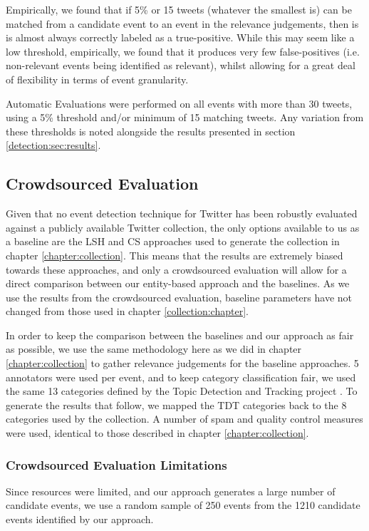 Empirically, we found that if 5\% or 15 tweets (whatever the smallest is) can be matched from a candidate event to an event in the relevance judgements, then is is almost always correctly labeled as a true-positive.
While this may seem like a low threshold, empirically, we found that it produces very few false-positives (i.e. non-relevant events being identified as relevant), whilst allowing for a great deal of flexibility in terms of event granularity.

Automatic Evaluations were performed on all events with more than 30 tweets, using a 5\% threshold and/or minimum of 15 matching tweets.
Any variation from these thresholds is noted alongside the results presented in section \ref{detection:sec:results}.

\subsection{Crowdsourced Evaluation}
\label{sec:baseline}
Given that no event detection technique for Twitter has been robustly evaluated against a publicly available Twitter collection, the only options available to us as a baseline are the LSH \citep{Petrovic10} and CS \citep{Aggarwal12} approaches used to generate the collection in chapter \ref{chapter:collection}.
This means that the results are extremely biased towards these approaches, and only a crowdsourced evaluation will allow for a direct comparison between our entity-based approach and the baselines.
As we use the results from the crowdsourced evaluation, baseline parameters have not changed from those used in chapter \ref{collection:chapter}.

\label{detection:sec:crowd}
In order to keep the comparison between the baselines and our approach as fair as possible, we use the same methodology here as we did in chapter \ref{chapter:collection} to gather relevance judgements for the baseline approaches.
5 annotators were used per event, and to keep category classification fair, we used the same 13 categories defined by the Topic Detection and Tracking project \citep{Allan:2002:ITD:772260.772262}.
To generate the results that follow, we mapped the TDT categories back to the 8 categories used by the collection.
A number of spam and quality control measures were used, identical to those described in chapter \ref{chapter:collection}.

\subsubsection{Crowdsourced Evaluation Limitations}
Since resources were limited, and our approach generates a large number of candidate events, we use a random sample of 250 events from the 1210 candidate events identified by our approach.

